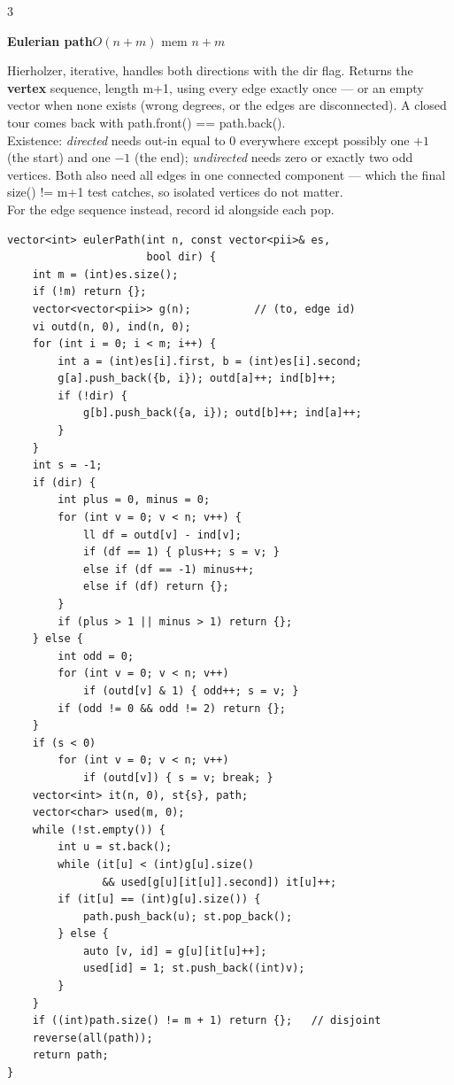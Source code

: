 \documentclass[9pt,a4paper]{extarticle}
\newcommand{\entry}[3]{%
  \addcontentsline{toc}{subsection}{#1}%
  \vspace{0.8ex}%
  \noindent\colorbox{hdbg}{\parbox{\dimexpr\columnwidth-2\fboxsep}{%
    \strut\textbf{#1}\hfill{\footnotesize\textsf{#2}}}}\par
  \vspace{0.4ex}%
  {\footnotesize #3\par}%
}
\newcommand{\code}[1]{{\ttfamily\small #1}}
\begin{document}
\begin{multicols*}{3}
\entry{Eulerian path}{$O(n + m)$ \quad mem $n + m$}{%
Hierholzer, iterative, handles both directions with the \code{dir} flag. Returns the
\textbf{vertex} sequence, length \code{m+1}, using every edge exactly once --- or an
empty vector when none exists (wrong degrees, or the edges are disconnected). A closed
tour comes back with \code{path.front() == path.back()}.\\[0.3ex]
Existence: \emph{directed} needs \code{out-in} equal to 0 everywhere except possibly one
$+1$ (the start) and one $-1$ (the end); \emph{undirected} needs zero or exactly two odd
vertices. Both also need all edges in one connected component --- which the final
\code{size() != m+1} test catches, so isolated vertices do not matter.\\[0.3ex]
For the edge sequence instead, record \code{id} alongside each pop.}

\begin{lstlisting}
vector<int> eulerPath(int n, const vector<pii>& es,
                      bool dir) {
    int m = (int)es.size();
    if (!m) return {};
    vector<vector<pii>> g(n);          // (to, edge id)
    vi outd(n, 0), ind(n, 0);
    for (int i = 0; i < m; i++) {
        int a = (int)es[i].first, b = (int)es[i].second;
        g[a].push_back({b, i}); outd[a]++; ind[b]++;
        if (!dir) {
            g[b].push_back({a, i}); outd[b]++; ind[a]++;
        }
    }
    int s = -1;
    if (dir) {
        int plus = 0, minus = 0;
        for (int v = 0; v < n; v++) {
            ll df = outd[v] - ind[v];
            if (df == 1) { plus++; s = v; }
            else if (df == -1) minus++;
            else if (df) return {};
        }
        if (plus > 1 || minus > 1) return {};
    } else {
        int odd = 0;
        for (int v = 0; v < n; v++)
            if (outd[v] & 1) { odd++; s = v; }
        if (odd != 0 && odd != 2) return {};
    }
    if (s < 0)
        for (int v = 0; v < n; v++)
            if (outd[v]) { s = v; break; }
    vector<int> it(n, 0), st{s}, path;
    vector<char> used(m, 0);
    while (!st.empty()) {
        int u = st.back();
        while (it[u] < (int)g[u].size()
               && used[g[u][it[u]].second]) it[u]++;
        if (it[u] == (int)g[u].size()) {
            path.push_back(u); st.pop_back();
        } else {
            auto [v, id] = g[u][it[u]++];
            used[id] = 1; st.push_back((int)v);
        }
    }
    if ((int)path.size() != m + 1) return {};   // disjoint
    reverse(all(path));
    return path;
}
\end{lstlisting}


\end{multicols*}
\end{document}
